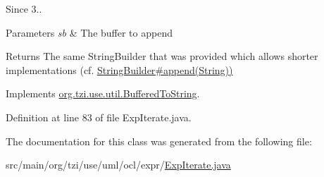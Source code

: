 \begin{DoxySince}{Since}
3.. 
\end{DoxySince}

\begin{DoxyParams}{Parameters}
{\em sb} & The buffer to append \\
\hline
\end{DoxyParams}
\begin{DoxyReturn}{Returns}
The same String\-Builder that was provided which allows shorter implementations (cf. \hyperlink{}{String\-Builder\#append(\-String))} 
\end{DoxyReturn}


Implements \hyperlink{interfaceorg_1_1tzi_1_1use_1_1util_1_1_buffered_to_string_aea95e4e53b18818d50ee253700e6e2d5}{org.\-tzi.\-use.\-util.\-Buffered\-To\-String}.



Definition at line 83 of file Exp\-Iterate.\-java.



The documentation for this class was generated from the following file\-:\begin{DoxyCompactItemize}
\item 
src/main/org/tzi/use/uml/ocl/expr/\hyperlink{_exp_iterate_8java}{Exp\-Iterate.\-java}\end{DoxyCompactItemize}
